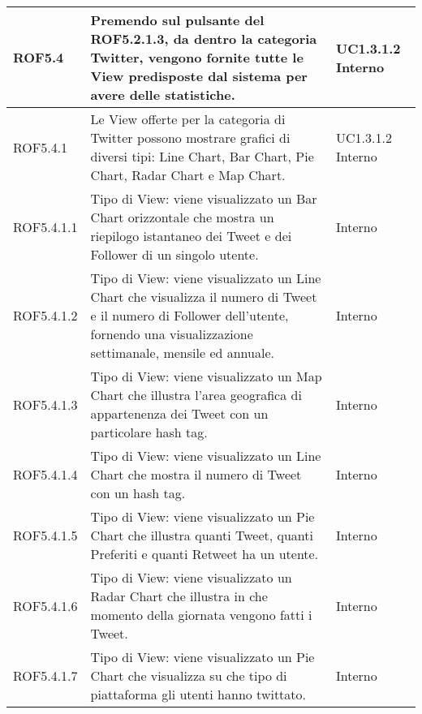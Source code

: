 \begin{center}
\begin{longtable}{| p{2.5cm} | p{8cm} | p{2cm} |}
		ROF5.4  &  Premendo sul pulsante del ROF5.2.1.3, da dentro la categoria Twitter, vengono fornite tutte le View predisposte dal sistema per avere delle statistiche. &  UC1.3.1.2 \newline Interno \\
		\hline
		ROF5.4.1  & Le View offerte per la categoria di Twitter possono mostrare grafici di diversi tipi: Line Chart, Bar Chart, Pie Chart, Radar Chart e Map Chart.  &  UC1.3.1.2 \newline Interno \\
		\hline
		ROF5.4.1.1  &  Tipo di View: viene visualizzato un Bar Chart orizzontale che mostra un riepilogo istantaneo dei Tweet e dei Follower di un singolo utente. & Interno \\
		\hline	
		ROF5.4.1.2  &  Tipo di View: viene visualizzato un Line Chart che visualizza il numero di Tweet e il numero di Follower dell'utente, fornendo una visualizzazione settimanale, mensile ed annuale. & Interno \\
		\hline
		ROF5.4.1.3  &  Tipo di View: viene visualizzato un Map Chart che illustra l'area geografica di appartenenza dei Tweet con un particolare hash tag. & Interno \\
		\hline
		ROF5.4.1.4  &  Tipo di View: viene visualizzato un Line Chart che mostra il numero di Tweet con un hash tag.  & Interno \\
		\hline
		ROF5.4.1.5  &  Tipo di View: viene visualizzato un Pie Chart che illustra quanti Tweet, quanti Preferiti e quanti Retweet ha un utente. & Interno \\
		\hline
		ROF5.4.1.6  &  Tipo di View: viene visualizzato un Radar Chart che illustra in che momento della giornata vengono fatti i Tweet. & Interno \\
		\hline
		ROF5.4.1.7  &  Tipo di View: viene visualizzato un Pie Chart che visualizza su che tipo di piattaforma gli utenti hanno twittato. & Interno \\
		\hline



\end{longtable}
\end{center}
